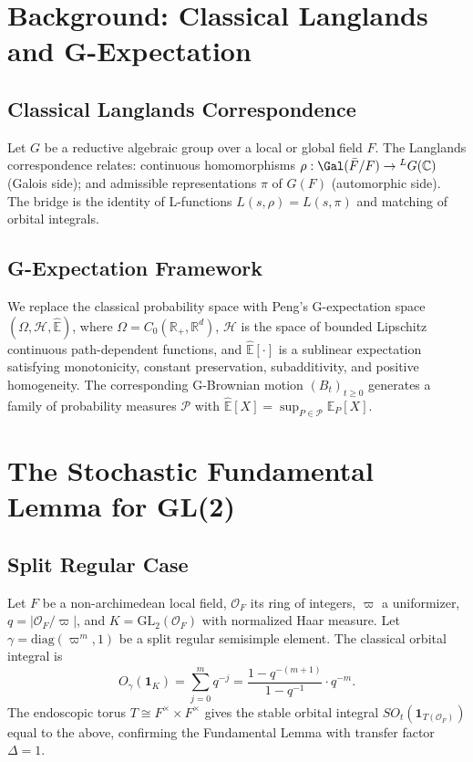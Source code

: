 \documentclass[11pt,a4paper]{article}
\theoremstyle{definition}
\newcommand{\GL}{\mathrm{GL}}
\newcommand{\diag}{\mathrm{diag}}
\newcommand{\GExp}{\hat{\mathbb{E}}}
\begin{document}
\section{Background: Classical Langlands and G-Expectation}\label{sec:background}

\subsection{Classical Langlands Correspondence}

Let $G$ be a reductive algebraic group over a local or global field $F$. The Langlands correspondence relates: continuous homomorphisms $\rho: \Gal(\bar{F}/F) \to {}^L G(\mathbb{C})$ (Galois side); and admissible representations $\pi$ of $G(F)$ (automorphic side). The bridge is the identity of L-functions $L(s,\rho) = L(s,\pi)$ and matching of orbital integrals.

\subsection{G-Expectation Framework}

We replace the classical probability space with Peng's G-expectation space $(\Omega, \mathcal{H}, \GExp)$, where $\Omega = C_0(\mathbb{R}_+, \mathbb{R}^d)$, $\mathcal{H}$ is the space of bounded Lipschitz continuous path-dependent functions, and $\GExp[\cdot]$ is a sublinear expectation satisfying monotonicity, constant preservation, subadditivity, and positive homogeneity. The corresponding G-Brownian motion $(B_t)_{t\ge 0}$ generates a family of probability measures $\mathcal{P}$ with $\GExp[X] = \sup_{P\in\mathcal{P}} \mathbb{E}_P[X]$.

\section{The Stochastic Fundamental Lemma for GL(2)}\label{sec:sfl}

\subsection{Split Regular Case}

Let $F$ be a non-archimedean local field, $\mathcal{O}_F$ its ring of integers, $\varpi$ a uniformizer, $q = |\mathcal{O}_F/\varpi|$, and $K = \GL_2(\mathcal{O}_F)$ with normalized Haar measure. Let $\gamma = \diag(\varpi^m, 1)$ be a split regular semisimple element. The classical orbital integral is
\[
O_\gamma(\mathbf{1}_K) = \sum_{j=0}^{m} q^{-j} = \frac{1-q^{-(m+1)}}{1-q^{-1}} \cdot q^{-m}.
\]
The endoscopic torus $T \cong F^\times \times F^\times$ gives the stable orbital integral $SO_t(\mathbf{1}_{T(\mathcal{O}_F)})$ equal to the above, confirming the Fundamental Lemma with transfer factor $\Delta = 1$.
\end{document}

